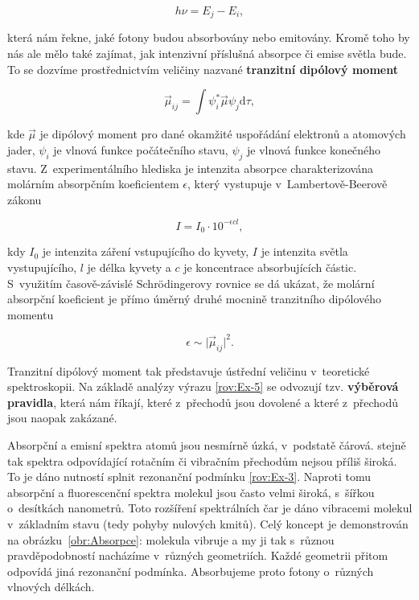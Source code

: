 \begin{equation}
h \nu = E_j - E_i,
\label{rov:Ex-2}
\end{equation}

\noindent která nám řekne, jaké fotony budou absorbovány nebo emitovány. Kromě toho by nás ale mělo také zajímat, jak intenzivní příslušná absorpce či emise světla bude. To se dozvíme prostřednictvím veličiny nazvané \textbf{tranzitní dipólový moment}


\begin{equation}
\vec{\mu}_{ij} = \int \psi_i^{\ast} \vec{\mu} \psi_j \mathrm{d} \tau,
\label{rov:Ex-3}
\end{equation}


\noindent kde $\vec{\mu}$ je dipólový moment pro dané okamžité uspořádání elektronů a atomových jader, $\psi_i$ je vlnová funkce počátečního stavu, $\psi_j$ je vlnová funkce konečného stavu. Z~experimentálního hlediska je intenzita absorpce charakterizována molárním absorpčním koeficientem $\epsilon$, který vystupuje v~Lambertově-Beerově zákonu

\begin{equation}
I = I_0 \cdot 10^{-\epsilon c l},
\label{rov:Ex-4}
\end{equation}

\noindent kdy $I_0$ je intenzita záření vstupujícího do kyvety, $I$ je intenzita světla vystupujícího, $l$ je délka kyvety a $c$ je koncentrace absorbujících částic. S~využitím časově-závislé Schr\"odingerovy rovnice se dá ukázat, že molární absorpční koeficient je přímo úměrný druhé mocnině tranzitního dipólového momentu

\begin{equation}
\epsilon \sim \vert \vec{\mu}_{ij} \vert^2.
\label{rov:Ex-5}
\end{equation}

Tranzitní dipólový moment tak představuje ústřední veličinu v~teoretické spektroskopii. Na základě analýzy výrazu \eqref{rov:Ex-5} se odvozují tzv. \textbf{výběrová pravidla}, která nám říkají, které z~přechodů jsou dovolené a které z~přechodů jsou naopak zakázané.

Absorpční a emisní spektra atomů jsou nesmírně úzká, v~podstatě čárová. stejně tak spektra odpovídající rotačním či vibračním přechodům nejsou příliš široká. To je dáno nutností splnit rezonanční podmínku \eqref{rov:Ex-3}. Naproti tomu absorpční a fluorescenční spektra molekul jsou často velmi široká, s~šířkou o~desítkách nanometrů. Toto rozšíření spektrálních čar je dáno vibracemi molekul v~základním stavu (tedy pohyby nulových kmitů). Celý koncept je demonstrován na obrázku~\ref{obr:Absorpce}: molekula vibruje  a my ji tak s~různou pravděpodobností nacházíme v~různých geometriích. Každé geometrii přitom odpovídá jiná rezonanční podmínka. Absorbujeme proto fotony o~různých vlnových délkách.

